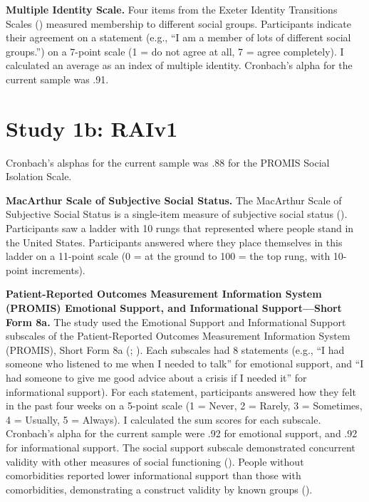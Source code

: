 \documentclass[
]{udthesis}
\begin{document}
\textbf{Multiple Identity Scale.} Four items from the Exeter Identity Transitions Scales () measured membership to different social groups. Participants indicate their agreement on a statement (e.g., ``I am a member of lots of different social groups.'') on a 7-point scale (1 = do not agree at all, 7 = agree completely). I calculated an average as an index of multiple identity. Cronbach's alpha for the current sample was .91.

\section{Study 1b: RAIv1}\label{study-1b-raiv1-1}

Cronbach's alsphas for the current sample was .88 for the PROMIS Social Isolation Scale.

\textbf{MacArthur Scale of Subjective Social Status.} The MacArthur Scale of Subjective Social Status is a single-item measure of subjective social status (). Participants saw a ladder with 10 rungs that represented where people stand in the United States. Participants answered where they place themselves in this ladder on a 11-point scale (0 = at the ground to 100 = the top rung, with 10-point increments).

\textbf{Patient-Reported Outcomes Measurement Information System (PROMIS) Emotional Support, and Informational Support---Short Form 8a.} The study used the Emotional Support and Informational Support subscales of the Patient-Reported Outcomes Measurement Information System (PROMIS), Short Form 8a (; ). Each subscales had 8 statements (e.g., ``I had someone who listened to me when I needed to talk'' for emotional support, and ``I had someone to give me good advice about a crisis if I needed it'' for informational support). For each statement, participants answered how they felt in the past four weeks on a 5-point scale (1 = Never, 2 = Rarely, 3 = Sometimes, 4 = Usually, 5 = Always). I calculated the sum scores for each subscale. Cronbach's alpha for the current sample were .92 for emotional support, and .92 for informational support. The social support subscale demonstrated concurrent validity with other measures of social functioning (). People without comorbidities reported lower informational support than those with comorbidities, demonstrating a construct validity by known groups ().
\end{document}
